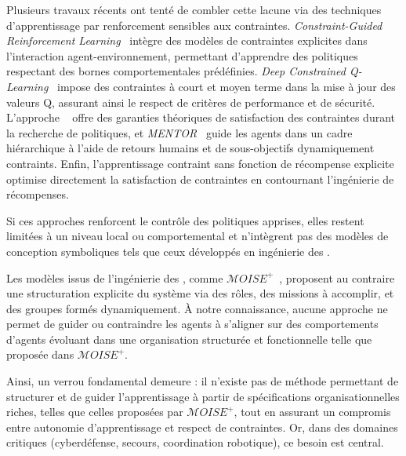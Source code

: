 \noindent
Plusieurs travaux récents ont tenté de combler cette lacune via des techniques d'apprentissage par renforcement sensibles aux contraintes. \textit{Constraint-Guided Reinforcement Learning}~\cite{spieker2021constraint} intègre des modèles de contraintes explicites dans l'interaction agent-environnement, permettant d'apprendre des politiques respectant des bornes comportementales prédéfinies. \textit{Deep Constrained Q-Learning}~\cite{kalweit2020deep} impose des contraintes à court et moyen terme dans la mise à jour des valeurs Q, assurant ainsi le respect de critères de performance et de sécurité. L'approche ~\cite{achiam2017constrained} offre des garanties théoriques de satisfaction des contraintes durant la recherche de politiques, et \textit{MENTOR}~\cite{zhou2025mentor} guide les agents dans un cadre hiérarchique à l'aide de retours humains et de sous-objectifs dynamiquement contraints. Enfin, l'apprentissage contraint sans fonction de récompense explicite~\cite{miryoosefi2022} optimise directement la satisfaction de contraintes en contournant l'ingénierie de récompenses.

\medskip

\noindent
Si ces approches renforcent le contrôle des politiques apprises, elles restent limitées à un niveau local ou comportemental et n'intègrent pas des modèles de conception symboliques tels que ceux développés en ingénierie des .

\medskip

\noindent
Les modèles issus de l'ingénierie des , comme \textit{$\mathcal{M}OISE^+$}~\cite{hubner2002moise}, proposent au contraire une structuration explicite du système via des rôles, des missions à accomplir, et des groupes formés dynamiquement. À notre connaissance, aucune approche ne permet de guider ou contraindre les agents à s'aligner sur des comportements d'agents évoluant dans une organisation structurée et fonctionnelle telle que proposée dans $\mathcal{M}OISE^+$. 



\medskip

\noindent
Ainsi, un verrou fondamental demeure : il n'existe pas de méthode permettant de structurer et de guider l'apprentissage  à partir de spécifications organisationnelles riches, telles que celles proposées par $\mathcal{M}OISE^+$, tout en assurant un compromis entre autonomie d'apprentissage et respect de contraintes. Or, dans des domaines critiques (cyberdéfense, secours, coordination robotique), ce besoin est central.

